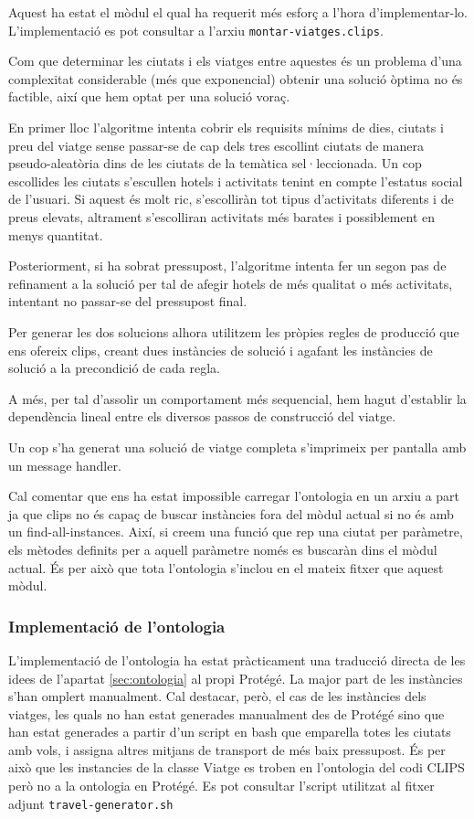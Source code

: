 \documentclass[11pt,a4paper]{article}
\begin{document}
Aquest ha estat el mòdul el qual ha requerit més esforç a l'hora d'implementar-lo. L'implementació es pot consultar a l'arxiu \texttt{montar-viatges.clips}.

Com que determinar les ciutats i els viatges entre aquestes és un problema d'una complexitat considerable (més que exponencial) obtenir una solució òptima no és factible, així que hem optat per una solució voraç.

En primer lloc l'algoritme intenta cobrir els requisits mínims de dies, ciutats i preu del viatge sense passar-se de cap dels tres escollint ciutats de manera pseudo-aleatòria dins de les ciutats de la temàtica sel·leccionada. Un cop escollides les ciutats s'escullen hotels i activitats tenint en compte l'estatus social de l'usuari. Si aquest és molt ric, s'escolliràn tot tipus d'activitats diferents i de preus elevats, altrament s'escolliran activitats més barates i possiblement en menys quantitat.

Posteriorment, si ha sobrat pressupost, l'algoritme intenta fer un segon pas de refinament a la solució per tal de afegir hotels de més qualitat o més activitats, intentant no passar-se del pressupost final.

Per generar les dos solucions alhora utilitzem les pròpies regles de producció que ens ofereix clips, creant dues instàncies de solució i agafant les instàncies de solució a la precondició de cada regla.

A més, per tal d'assolir un comportament més sequencial, hem hagut d'establir la dependència lineal entre els diversos passos de construcció del viatge. 

Un cop s'ha generat una solució de viatge completa s'imprimeix per pantalla amb un message handler.

Cal comentar que ens ha estat impossible carregar l'ontologia en un arxiu a part ja que clips no és capaç de buscar instàncies fora del mòdul actual si no és amb un find-all-instances. Així, si creem una funció que rep una ciutat per paràmetre, els mètodes definits per a aquell paràmetre només es buscaràn dins el mòdul actual. És per això que tota l'ontologia s'inclou en el mateix fitxer que aquest mòdul.




\subsubsection{Implementació de l'ontologia}
L'implementació de l'ontologia ha estat pràcticament una traducció directa de les idees de l'apartat \ref{sec:ontologia} al propi Protégé. La major part de les instàncies s'han omplert manualment. Cal destacar, però, el cas de les instàncies dels viatges, les quals no han estat generades manualment des de Protégé sino que han estat generades a partir d'un script en bash que emparella totes les ciutats amb vols, i assigna altres mitjans de transport de més baix pressupost. És per això que les instancies de la classe Viatge es troben en l'ontologia del codi CLIPS però no a la ontologia en Protégé. Es pot consultar l'script utilitzat al fitxer adjunt \texttt{travel-generator.sh}
\end{document}
